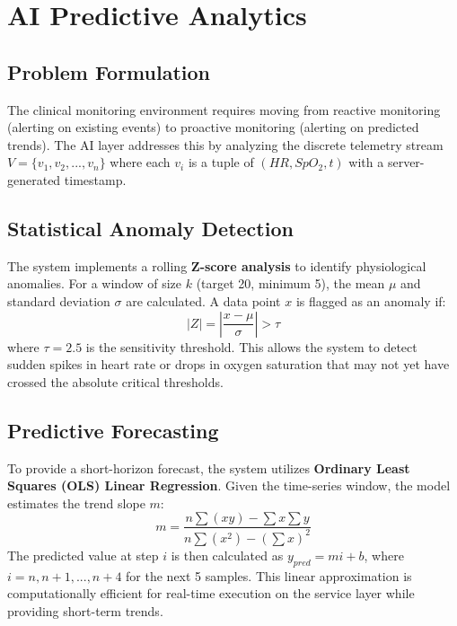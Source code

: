 \chapter{AI Predictive Analytics}
\label{ch:ai_predictive}

\section{Problem Formulation}
The clinical monitoring environment requires moving from reactive monitoring (alerting on existing events) to proactive monitoring (alerting on predicted trends). The AI layer addresses this by analyzing the discrete telemetry stream $V = \{v_1, v_2, ..., v_n\}$ where each $v_i$ is a tuple of $(HR, SpO_2, t)$ with a server-generated timestamp.

\section{Statistical Anomaly Detection}
The system implements a rolling \textbf{Z-score analysis} to identify physiological anomalies. For a window of size $k$ (target 20, minimum 5), the mean $\mu$ and standard deviation $\sigma$ are calculated. A data point $x$ is flagged as an anomaly if:
\begin{equation}
    |Z| = \left| \frac{x - \mu}{\sigma} \right| > \tau
\end{equation}
where $\tau = 2.5$ is the sensitivity threshold. This allows the system to detect sudden spikes in heart rate or drops in oxygen saturation that may not yet have crossed the absolute critical thresholds.

\section{Predictive Forecasting}
To provide a short-horizon forecast, the system utilizes \textbf{Ordinary Least Squares (OLS) Linear Regression}. Given the time-series window, the model estimates the trend slope $m$:
\begin{equation}
    m = \frac{n\sum(xy) - \sum x \sum y}{n\sum(x^2) - (\sum x)^2}
\end{equation}
The predicted value at step $i$ is then calculated as $y_{pred} = m i + b$, where
$i = n, n+1, ..., n+4$ for the next 5 samples. This linear approximation is
computationally efficient for real-time execution on the service layer while
providing short-term trends.

